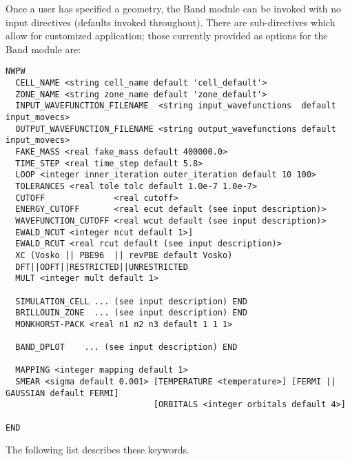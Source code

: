 Once a user has specified a geometry, the Band module can be invoked with no input directives (defaults invoked throughout).  There are sub-directives which allow for customized application; those currently provided as options for the Band module are:
\begin{verbatim}
NWPW
  CELL_NAME <string cell_name default 'cell_default'>
  ZONE_NAME <string zone_name default 'zone_default'>
  INPUT_WAVEFUNCTION_FILENAME  <string input_wavefunctions  default input_movecs>
  OUTPUT_WAVEFUNCTION_FILENAME <string output_wavefunctions default input_movecs>
  FAKE_MASS <real fake_mass default 400000.0>
  TIME_STEP <real time_step default 5.8>
  LOOP <integer inner_iteration outer_iteration default 10 100>
  TOLERANCES <real tole tolc default 1.0e-7 1.0e-7>
  CUTOFF              <real cutoff>
  ENERGY_CUTOFF       <real ecut default (see input description)>
  WAVEFUNCTION_CUTOFF <real wcut default (see input description)>
  EWALD_NCUT <integer ncut default 1>]
  EWALD_RCUT <real rcut default (see input description)>
  XC (Vosko || PBE96  || revPBE default Vosko)
  DFT||ODFT||RESTRICTED||UNRESTRICTED
  MULT <integer mult default 1>
  
  SIMULATION_CELL ... (see input description) END
  BRILLOUIN_ZONE  ... (see input description) END
  MONKHORST-PACK <real n1 n2 n3 default 1 1 1>

  BAND_DPLOT    ... (see input description) END

  MAPPING <integer mapping default 1>
  SMEAR <sigma default 0.001> [TEMPERATURE <temperature>] [FERMI || GAUSSIAN default FERMI] 
                              [ORBITALS <integer orbitals default 4>]

END 
\end{verbatim}
The following list describes these keywords.
